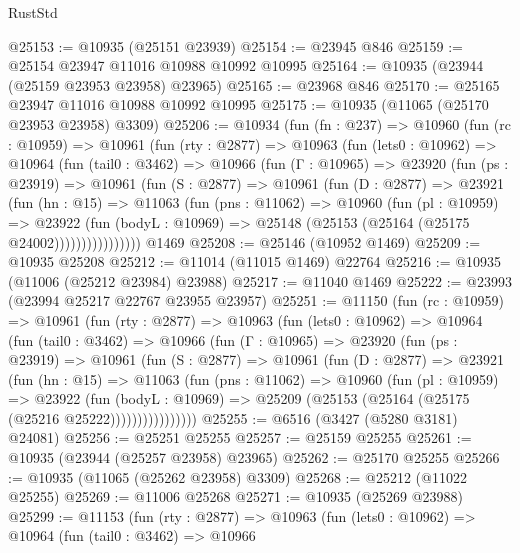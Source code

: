 \begin{lexlean}{RustStd}
\begin{coremodule}
{{{{{{{{{{{{{{{{{{{@25153 := @10935 (@25151 @23939)
@25154 := @23945 @846
@25159 := @25154 @23947 @11016 @10988 @10992 @10995
@25164 := @10935 (@23944 (@25159 @23953 @23958) @23965)
@25165 := @23968 @846
@25170 := @25165 @23947 @11016 @10988 @10992 @10995
@25175 := @10935 (@11065 (@25170 @23953 @23958) @3309)
@25206 := @10934
    (fun (fn : @237) =>
    @10960
      (fun (rc : @10959) =>
      @10961
        (fun (rty : @2877) =>
        @10963
          (fun (lets0 : @10962) =>
          @10964
            (fun (tail0 : @3462) =>
            @10966
              (fun (Γ : @10965) =>
              @23920
                (fun (ps : @23919) =>
                @10961
                  (fun (S : @2877) =>
                  @10961
                    (fun (D : @2877) =>
                    @23921
                      (fun (hn : @15) =>
                      @11063
                        (fun (pns : @11062) =>
                        @10960
                          (fun (pl : @10959) =>
                          @23922
                            (fun (bodyL : @10969) =>
                            @25148 (@25153 (@25164 (@25175 @24002))))))))))))))))
    @1469
@25208 := @25146 (@10952 @1469)
@25209 := @10935 @25208
@25212 := @11014 (@11015 @1469) @22764
@25216 := @10935 (@11006 (@25212 @23984) @23988)
@25217 := @11040 @1469
@25222 := @23993 (@23994 @25217 @22767 @23955 @23957)
@25251 := @11150
    (fun (rc : @10959) =>
    @10961
      (fun (rty : @2877) =>
      @10963
        (fun (lets0 : @10962) =>
        @10964
          (fun (tail0 : @3462) =>
          @10966
            (fun (Γ : @10965) =>
            @23920
              (fun (ps : @23919) =>
              @10961
                (fun (S : @2877) =>
                @10961
                  (fun (D : @2877) =>
                  @23921
                    (fun (hn : @15) =>
                    @11063
                      (fun (pns : @11062) =>
                      @10960
                        (fun (pl : @10959) =>
                        @23922
                          (fun (bodyL : @10969) =>
                          @25209 (@25153 (@25164 (@25175 (@25216 @25222))))))))))))))))
@25255 := @6516 (@3427 (@5280 @3181) @24081)
@25256 := @25251 @25255
@25257 := @25159 @25255
@25261 := @10935 (@23944 (@25257 @23958) @23965)
@25262 := @25170 @25255
@25266 := @10935 (@11065 (@25262 @23958) @3309)
@25268 := @25212 (@11022 @25255)
@25269 := @11006 @25268
@25271 := @10935 (@25269 @23988)
@25299 := @11153
    (fun (rty : @2877) =>
    @10963
      (fun (lets0 : @10962) =>
      @10964
        (fun (tail0 : @3462) =>
        @10966
}}}}}}}}}}}}}}}}}}}
\end{coremodule}
\end{lexlean}
